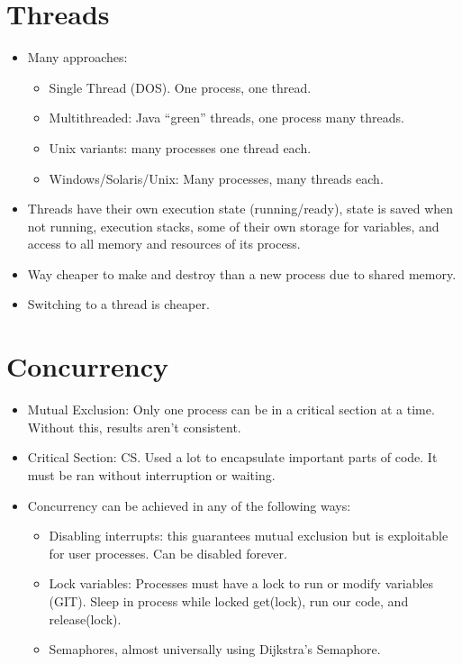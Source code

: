 \documentclass[fontsize=5pt]{scrartcl}
\begin{document}
\begin{multicols}{3}
\begin{itemize}
      \end{itemize}
      
     \section{Threads}
      \begin{itemize}
       \item Many approaches: 
       \begin{itemize}
        \item Single Thread (DOS). One process, one thread.
        \item Multithreaded: Java ``green'' threads, one process many threads.
        \item Unix variants: many processes one thread each.
        \item Windows/Solaris/Unix: Many processes, many threads each.
       \end{itemize}
       \item Threads have their own execution state (running/ready), state is saved when not running, execution stacks, 
             some of their own storage for variables, and access to all memory and resources of its process.
       \item Way cheaper to make and destroy than a new process due to shared memory.
       \item Switching to a thread is cheaper.
      \end{itemize}
      
      \section{Concurrency}
        \begin{itemize}
          \item Mutual Exclusion: Only one process can be in a critical section at a time. Without this, results aren't consistent.
          \item Critical Section: CS. Used a lot to encapsulate important parts of code. It must be ran without interruption or waiting.
          \item Concurrency can be achieved in any of the following ways:
          \begin{itemize}
            \item Disabling interrupts: this guarantees mutual exclusion but is exploitable for user processes. Can be disabled forever.
            \item Lock variables: Processes must have a lock to run or modify variables (GIT). Sleep in process while locked
                  get(lock), run our code, and release(lock).
            \item Semaphores, almost universally using Dijkstra's Semaphore.
          \end{itemize}


\end{itemize}
\end{multicols}
\end{document}
